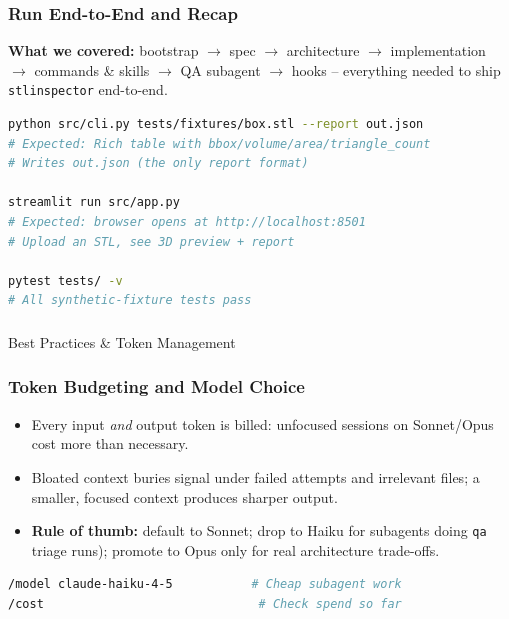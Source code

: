 \begin{frame}[fragile]\frametitle{Run End-to-End and Recap}
\textbf{What we covered:} bootstrap $\to$ spec $\to$ architecture $\to$ implementation $\to$ commands \& skills $\to$ QA subagent $\to$ hooks -- everything needed to ship \texttt{stlinspector} end-to-end.

\begin{lstlisting}[language=bash]
python src/cli.py tests/fixtures/box.stl --report out.json
# Expected: Rich table with bbox/volume/area/triangle_count
# Writes out.json (the only report format)

streamlit run src/app.py
# Expected: browser opens at http://localhost:8501
# Upload an STL, see 3D preview + report

pytest tests/ -v      
# All synthetic-fixture tests pass
\end{lstlisting}
\end{frame}


\begin{frame}[fragile]\frametitle{}
\begin{center}
{\Large Best Practices \& Token Management}
\end{center}
\end{frame}


\begin{frame}[fragile]\frametitle{Token Budgeting and Model Choice}
  \begin{itemize}
    \item Every input \textit{and} output token is billed: unfocused sessions on Sonnet/Opus cost more than necessary.
    \item Bloated context buries signal under failed attempts and irrelevant files; a smaller, focused context produces sharper output.
    \item \textbf{Rule of thumb:} default to Sonnet; drop to Haiku for subagents doing \texttt{qa} triage runs); promote to Opus only for real architecture trade-offs.
  \end{itemize}
\begin{lstlisting}[language=bash]
/model claude-haiku-4-5           # Cheap subagent work
/cost                              # Check spend so far
\end{lstlisting}
\end{frame}



